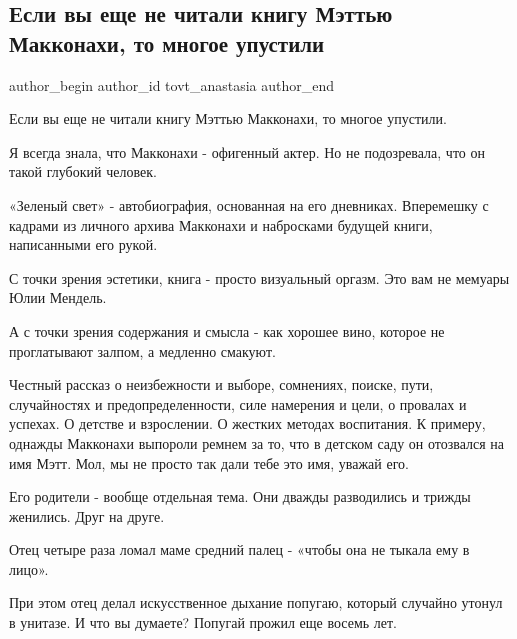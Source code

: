  
 
 
 
 
 
\subsection{Если вы еще не читали книгу Мэттью Макконахи, то многое упустили}
\label{sec:17_12_2021.fb.tovt_anastasia.1.kniga}
 
\ifcmt
 author_begin
   author_id tovt_anastasia
 author_end
\fi

Если вы еще не читали книгу Мэттью Макконахи, то многое упустили. 

Я всегда знала, что Макконахи - офигенный актер. Но не подозревала, что он
такой глубокий человек. 

«Зеленый свет» - автобиография, основанная на его дневниках. Вперемешку с
кадрами из личного архива Макконахи и набросками будущей книги, написанными его
рукой. 


С точки зрения эстетики, книга - просто визуальный оргазм. Это вам не мемуары
Юлии Мендель. 

А с точки зрения содержания и смысла - как хорошее вино, которое не
проглатывают залпом, а медленно смакуют. 

Честный рассказ о неизбежности и выборе, сомнениях, поиске, пути, случайностях
и предопределенности, силе намерения и цели, о провалах и успехах. О детстве и
взрослении. О жестких методах воспитания. К примеру, однажды Макконахи выпороли
ремнем за то, что в детском саду он отозвался на имя Мэтт. Мол, мы не просто
так дали тебе это имя, уважай его. 

Его родители - вообще отдельная тема. Они дважды разводились и трижды женились.
Друг на друге. 

Отец четыре раза ломал маме средний палец - «чтобы она не тыкала ему в лицо». 

При этом отец делал искусственное дыхание попугаю, который случайно утонул в
унитазе. И что вы думаете? Попугай прожил еще восемь лет. 

